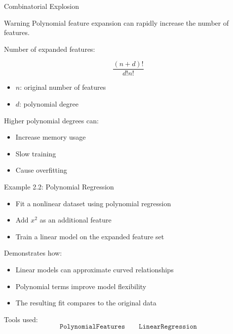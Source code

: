 \documentclass[aspectratio=169]{beamer}
\begin{document}

\begin{frame}{Combinatorial Explosion}
	
	\begin{alertblock}{Warning}
		Polynomial feature expansion can rapidly increase the number of features.
	\end{alertblock}
	
	\vspace{0.5em}
	
	Number of expanded features:
	
	\[
	\frac{(n+d)!}{d!n!}
	\]
	
	\vspace{0.5em}
	
	\begin{itemize}
		\item $n$: original number of features
		\item $d$: polynomial degree
	\end{itemize}
	
	\vspace{0.5em}
	
	Higher polynomial degrees can:
	\begin{itemize}
		\item Increase memory usage
		\item Slow training
		\item Cause overfitting
	\end{itemize}
	
\end{frame}


\begin{frame}{Example 2.2: Polynomial Regression}
	
	\begin{itemize}
		\item Fit a nonlinear dataset using polynomial regression
		\item Add $x^2$ as an additional feature
		\item Train a linear model on the expanded feature set
	\end{itemize}
	
	\vspace{0.5em}
	
	Demonstrates how:
	\begin{itemize}
		\item Linear models can approximate curved relationships
		\item Polynomial terms improve model flexibility
		\item The resulting fit compares to the original data
	\end{itemize}
	
	\vspace{0.5em}
	
	Tools used:
	\[
	\texttt{PolynomialFeatures}
	\qquad
	\texttt{LinearRegression}
	\]
	
\end{frame}
\end{document}
